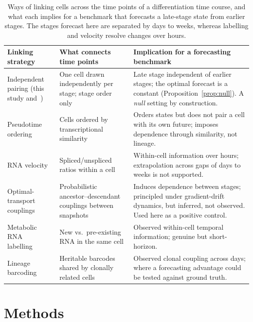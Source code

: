 \documentclass[10pt,journal,compsoc]{IEEEtran}
\begin{document}
\begin{table}[!t]
\centering
\caption{Ways of linking cells across the time points of a differentiation time course, and what each implies for a benchmark that forecasts a late-stage state from earlier stages. The stages forecast here are separated by days to weeks, whereas labelling and velocity resolve changes over hours.}
\label{tab:rigor}
\footnotesize
\setlength{\tabcolsep}{5pt}
\renewcommand{\arraystretch}{1.1}
\begin{tabular}{>{\raggedright\arraybackslash}p{3.4cm} >{\raggedright\arraybackslash}p{5.4cm} >{\raggedright\arraybackslash}p{7.8cm}}
\toprule
\textbf{Linking strategy} & \textbf{What connects time points} & \textbf{Implication for a forecasting benchmark} \\
\midrule
Independent pairing (this study and~\cite{kanu2026transformer}) & One cell drawn independently per stage; stage order only & Late stage independent of earlier stages; the optimal forecast is a constant (Proposition~\ref{prop:null}). A \emph{null} setting by construction. \\
Pseudotime ordering~\cite{haghverdi2016diffusion,saelens2019comparison} & Cells ordered by transcriptional similarity & Orders states but does not pair a cell with its own future; imposes dependence through similarity, not lineage. \\
RNA velocity~\cite{la2018rna,bergen2020generalizing} & Spliced/unspliced ratios within a cell & Within-cell information over hours; extrapolation across gaps of days to weeks is not supported. \\
Optimal-transport couplings~\cite{schiebinger2019optimal,lavenant2024toward} & Probabilistic ancestor--descendant couplings between snapshots & Induces dependence between stages; principled under gradient-drift dynamics, but inferred, not observed. Used here as a positive control. \\
Metabolic RNA labelling~\cite{erhard2019scslam,cao2020scifate} & New vs.\ pre-existing RNA in the same cell & Observed within-cell temporal information; genuine but short-horizon. \\
Lineage barcoding~\cite{weinreb2020lineage} & Heritable barcodes shared by clonally related cells & Observed clonal coupling across days; where a forecasting advantage could be tested against ground truth. \\
\bottomrule
\end{tabular}
\end{table}


\section{Methods}
\label{sec:methods}
\end{document}
